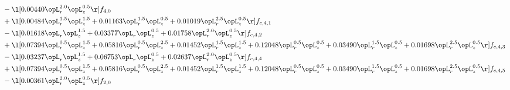 \begin{alignat}{2}
& - \l[  0.00440 \opL_r^{2.0} \opL_z^{0.5}  \r] f_{4,0} \nonumber \\ 
& + \l[  0.00484 \opL_r^{1.5} \opL_z^{1.5} +  0.01163 \opL_r^{1.5} \opL_z^{0.5} +  0.01019 \opL_r^{2.5} \opL_z^{0.5}  \r] f_{c,4,1} \nonumber \\ 
& - \l[  0.01618 \opL_r \opL_z^{1.5} +  0.03377 \opL_r \opL_z^{0.5} +  0.01758 \opL_r^{2.0} \opL_z^{0.5}  \r] f_{c,4,2} \nonumber \\ 
& + \l[  0.07394 \opL_r^{0.5} \opL_z^{1.5} +  0.05816 \opL_r^{0.5} \opL_z^{2.5} +  0.01452 \opL_r^{1.5} \opL_z^{1.5} +  0.12048 \opL_r^{0.5} \opL_z^{0.5} +  0.03490 \opL_r^{1.5} \opL_z^{0.5} +  0.01698 \opL_r^{2.5} \opL_z^{0.5}  \r] f_{c,4,3} \nonumber \\ 
& - \l[  0.03237 \opL_r \opL_z^{1.5} +  0.06753 \opL_r \opL_z^{0.5} +  0.02637 \opL_r^{2.0} \opL_z^{0.5}  \r] f_{c,4,4} \nonumber \\ 
& + \l[  0.07394 \opL_r^{0.5} \opL_z^{1.5} +  0.05816 \opL_r^{0.5} \opL_z^{2.5} +  0.01452 \opL_r^{1.5} \opL_z^{1.5} +  0.12048 \opL_r^{0.5} \opL_z^{0.5} +  0.03490 \opL_r^{1.5} \opL_z^{0.5} +  0.01698 \opL_r^{2.5} \opL_z^{0.5}  \r] f_{c,4,5} \nonumber \\ 
& - \l[  0.00361 \opL_r^{2.0} \opL_z^{0.5}  \r] f_{2,0} \nonumber \\ 
\end{alignat} 


